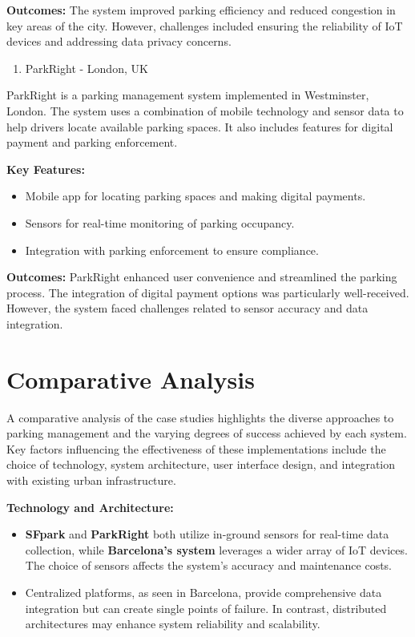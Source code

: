 \documentclass[oneside, 12pt, a4paper, draft]{book}
\begin{document}
\textbf{Outcomes:}
The system improved parking efficiency and reduced congestion in key areas of the city. However, challenges included ensuring the reliability of IoT devices and addressing data privacy concerns.

\begin{enumerate}
\item ParkRight - London, UK
\end{enumerate}
ParkRight is a parking management system implemented in Westminster, London. The system uses a combination of mobile technology and sensor data to help drivers locate available parking spaces. It also includes features for digital payment and parking enforcement.

\textbf{Key Features:}
\begin{itemize}
\item Mobile app for locating parking spaces and making digital payments.
\item Sensors for real-time monitoring of parking occupancy.
\item Integration with parking enforcement to ensure compliance.
\end{itemize}

\textbf{Outcomes:}
ParkRight enhanced user convenience and streamlined the parking process. The integration of digital payment options was particularly well-received. However, the system faced challenges related to sensor accuracy and data integration.
\section{Comparative Analysis}
\label{sec:org6aa6cdc}

A comparative analysis of the case studies highlights the diverse approaches to parking management and the varying degrees of success achieved by each system. Key factors influencing the effectiveness of these implementations include the choice of technology, system architecture, user interface design, and integration with existing urban infrastructure.

\textbf{Technology and Architecture:}
\begin{itemize}
\item \textbf{SFpark} and \textbf{ParkRight} both utilize in-ground sensors for real-time data collection, while \textbf{Barcelona's system} leverages a wider array of IoT devices. The choice of sensors affects the system's accuracy and maintenance costs.
\item Centralized platforms, as seen in Barcelona, provide comprehensive data integration but can create single points of failure. In contrast, distributed architectures may enhance system reliability and scalability.
\end{itemize}
\end{document}

